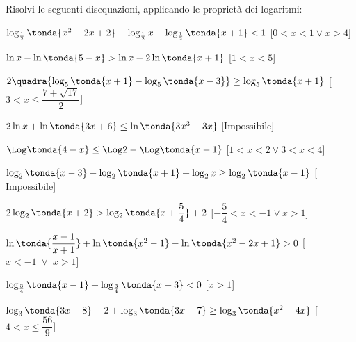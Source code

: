 \begin{esercizio}\label{ese:}
 Risolvi le seguenti disequazioni, applicando le proprietà dei logaritmi:
 \begin{enumeratea}
   \item \(\log_{\frac{1}{2}} \tonda{x^2-2x+2}-\log_{\frac{1}{2}} x- 
\log_{\frac{1}{2}} \tonda{x+1}<1\)
   \hfill [\(0<x<1 \lor x>4\)]
   \item \(\ln x-\ln \tonda{5-x}>\ln x-2\ln  \tonda{x+1}\)
   \hfill [\(1<x<5\)]
   \item \(2 \quadra{\log_5 \tonda{x+1}-\log_5 \tonda{x-3}}\geq\log_5 
\tonda{x+1}\)
   \hfill [\(3<x\leq \dfrac{7+\sqrt{17}}{2}\)]
   \item \(2 \ln x+\ln \tonda{3x+6}\leq\ln \tonda{3x^3-3x}\)
   \hfill [\(\text{Impossibile}\)]
   \item \(\Log \tonda{4-x}\leq\Log 2 -\Log \tonda{x-1}\)
   \hfill [\(1<x<2 \lor 3<x<4\)]
   \item \(\log_2 \tonda{x-3} -\log_2 \tonda{x+1}+\log_2 x \geq \log_2 
\tonda{x-1}\)
   \hfill [\(\text{Impossibile}\)]
   \item \(2 \log_2 \tonda{x+2}>\log_2 \tonda{x+\dfrac{5}{4}}+2\)
   \hfill [\(-\dfrac{5}{4}<x<-1 \lor x >1\)]
   \item \(\ln \tonda{\dfrac{x-1}{x+1}}+\ln \tonda{x^2-1}-\ln 
\tonda{x^2-2x+1}>0\)
   \hfill [\(x<-1 \;\lor\; x>1\)]
   \item \(\log_{\frac{3}{4}} 
\tonda{x-1}+\log_{\frac{3}{4}}\tonda{x+3}<0\)
   \hfill [\(x>1\)]
   \item \(\log_3 \tonda{3x-8}-2+\log_3 \tonda{3x-7}\geq\log_3 
\tonda{x^2-4x}\)
   \hfill [\(4<x\leq\dfrac{56}{9}\)]
 \end{enumeratea}
\end{esercizio}



